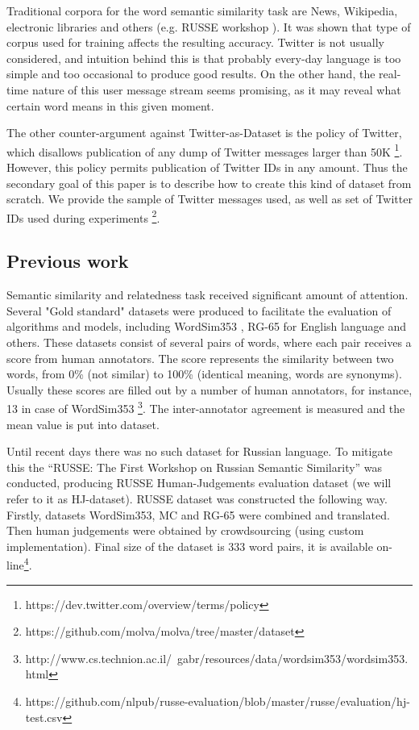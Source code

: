 \documentclass{llncs}
\begin{document}
Traditional corpora for the word semantic similarity task are News, Wikipedia, electronic libraries and others (e.g. RUSSE workshop \cite{Panchenko2015}). It was shown that type of corpus used for training affects the resulting accuracy. Twitter is not usually considered, and intuition behind this is that probably every-day language is too simple and too occasional to produce good results. On the other hand, the real-time nature of this user message stream seems promising, as it may reveal what certain word means in this given moment.  

The other counter-argument against Twitter-as-Dataset is the policy of Twitter, which disallows publication of any dump of Twitter messages larger than 50K \footnote{https://dev.twitter.com/overview/terms/policy}. However, this policy permits publication of Twitter IDs in any amount. Thus the secondary goal of this paper is to describe how to create this kind of dataset from scratch. We provide the sample of Twitter messages used, as well as set of Twitter IDs used during experiments \footnote{https://github.com/molva/molva/tree/master/dataset}.

\subsection{Previous work}
%
Semantic similarity and relatedness task received significant amount of attention. Several "Gold standard" datasets were produced to facilitate the evaluation of algorithms and models, including WordSim353 \cite{WordSim353}, RG-65 \cite{RG-65} for English language and others. These datasets consist of several pairs of words, where each pair receives a score from human annotators. The score represents the similarity between two words, from 0\% (not similar) to 100\% (identical meaning, words are synonyms). Usually these scores are filled out by a number of human annotators, for instance, 13 in case of WordSim353 \footnote{http://www.cs.technion.ac.il/~gabr/resources/data/wordsim353/wordsim353.html}. The inter-annotator agreement is measured and the mean value is put into dataset. 

Until recent days there was no such dataset for Russian language. To mitigate this the “RUSSE: The First Workshop on Russian Semantic Similarity”\cite{Panchenko2015} was conducted, producing RUSSE Human-Judgements evaluation dataset (we will refer to it as HJ-dataset). RUSSE dataset was constructed the following way. Firstly, datasets WordSim353, MC \cite{MC} and RG-65 were combined and translated. Then human judgements were obtained by crowdsourcing (using custom implementation). Final size of the dataset is 333 word pairs, it is available on-line\footnote{https://github.com/nlpub/russe-evaluation/blob/master/russe/evaluation/hj-test.csv}.
\end{document}
